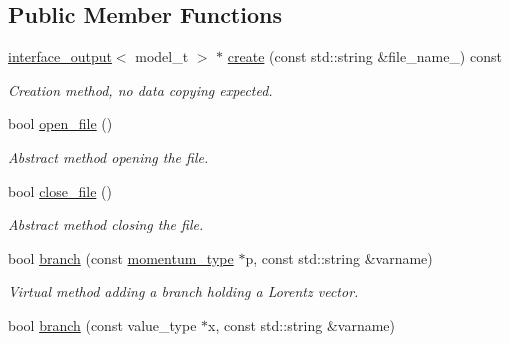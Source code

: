 \subsection*{Public Member Functions}
\begin{DoxyCompactItemize}
\item 
\hypertarget{a00017_af57ec7a3a2bda096ef2d53f51e05bb65}{\hyperlink{a00315}{interface\-\_\-output}$<$ model\-\_\-t $>$ $\ast$ \hyperlink{a00017_af57ec7a3a2bda096ef2d53f51e05bb65}{create} (const std\-::string \&file\-\_\-name\-\_\-) const }\label{a00017_af57ec7a3a2bda096ef2d53f51e05bb65}

\begin{DoxyCompactList}\small\item\em Creation method, no data copying expected. \end{DoxyCompactList}\item 
\hypertarget{a00017_aa2e585f2d6fcecdb532fa4465474a4a0}{bool \hyperlink{a00017_aa2e585f2d6fcecdb532fa4465474a4a0}{open\-\_\-file} ()}\label{a00017_aa2e585f2d6fcecdb532fa4465474a4a0}

\begin{DoxyCompactList}\small\item\em Abstract method opening the file. \end{DoxyCompactList}\item 
\hypertarget{a00017_abf39e5b9a7ca84fda5756c8e9b61ce2f}{bool \hyperlink{a00017_abf39e5b9a7ca84fda5756c8e9b61ce2f}{close\-\_\-file} ()}\label{a00017_abf39e5b9a7ca84fda5756c8e9b61ce2f}

\begin{DoxyCompactList}\small\item\em Abstract method closing the file. \end{DoxyCompactList}\item 
\hypertarget{a00017_a2267177d35239d603fcfb31fbd1a24d9}{bool \hyperlink{a00017_a2267177d35239d603fcfb31fbd1a24d9}{branch} (const \hyperlink{a00559}{momentum\-\_\-type} $\ast$p, const std\-::string \&varname)}\label{a00017_a2267177d35239d603fcfb31fbd1a24d9}

\begin{DoxyCompactList}\small\item\em Virtual method adding a branch holding a Lorentz vector. \end{DoxyCompactList}\item 
\hypertarget{a00017_a5ab7a2bbc80638b1f507329af52b6c6c}{bool \hyperlink{a00017_a5ab7a2bbc80638b1f507329af52b6c6c}{branch} (const value\-\_\-type $\ast$x, const std\-::string \&varname)}\label{a00017_a5ab7a2bbc80638b1f507329af52b6c6c}


\end{DoxyCompactItemize}
